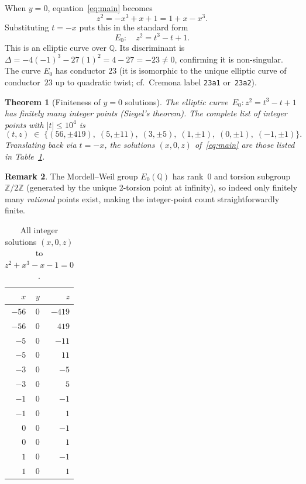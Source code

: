 \documentclass[12pt,a4paper]{article}
\newtheorem{theorem}{Theorem}[section]
\theoremstyle{definition}
\newtheorem{remark}[theorem]{Remark}
\newcommand{\Z}{\mathbb{Z}}
\newcommand{\Q}{\mathbb{Q}}
\begin{document}
When $y=0$, equation~\eqref{eq:main} becomes
\[
  z^2 = -x^3 + x + 1 = 1 + x - x^3.
\]
Substituting $t = -x$ puts this in the standard form
\begin{equation}\label{eq:ell}
  E_0:\quad z^2 = t^3 - t + 1.
\end{equation}
This is an elliptic curve over $\Q$.  Its discriminant is $\Delta = -4(-1)^3 - 27(1)^2 = 4 - 27 = -23\ne0$, confirming it is non-singular. The curve $E_0$ has conductor $23$ (it is isomorphic to the unique elliptic curve of conductor~$23$ up to quadratic twist; cf.\ Cremona label \texttt{23a1} or~\texttt{23a2}).

\begin{theorem}[Finiteness of $y=0$ solutions]\label{thm:y0finite}
  The elliptic curve~$E_0: z^2 = t^3-t+1$ has finitely many integer points
  (Siegel's theorem).  The complete list of integer points with $|t|\le 10^4$
  is
  \[
    (t,z) \;\in\; \{(56,\pm 419),\; (5,\pm 11),\; (3,\pm 5),\;
                    (1,\pm 1),\; (0,\pm 1),\; (-1,\pm 1)\}.
  \]
  Translating back via $t=-x$, the solutions $(x,0,z)$ of~\eqref{eq:main} are
  those listed in Table~\ref{tab:y0}.
\end{theorem}

\begin{remark}
  The Mordell--Weil group $E_0(\Q)$ has rank~$0$ and torsion subgroup
  $\Z/2\Z$ (generated by the unique 2-torsion point at infinity), so indeed
  only finitely many \emph{rational} points exist, making the integer-point
  count straightforwardly finite.
\end{remark}

\begin{table}[h]
\centering
\caption{All integer solutions $(x,0,z)$ to $z^2 + x^3 - x - 1 = 0$.}
\label{tab:y0}
\begin{tabular}{rrr}
\toprule
$x$ & $y$ & $z$ \\
\midrule
$-56$ & $0$ & $-419$ \\
$-56$ & $0$ & $419$ \\
$-5$  & $0$ & $-11$  \\
$-5$  & $0$ & $11$   \\
$-3$  & $0$ & $-5$   \\
$-3$  & $0$ & $5$    \\
$-1$  & $0$ & $-1$   \\
$-1$  & $0$ & $1$    \\
$0$   & $0$ & $-1$   \\
$0$   & $0$ & $1$    \\
$1$   & $0$ & $-1$   \\
$1$   & $0$ & $1$    \\
\bottomrule
\end{tabular}
\end{table}
\end{document}
